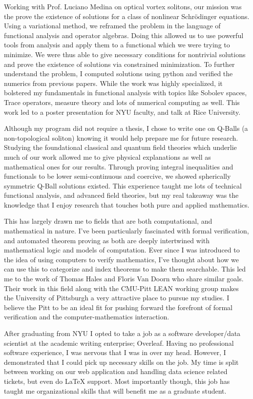 \documentclass[11pt]{article}
\begin{document}
Working with Prof. Luciano Medina on optical vortex solitons, our mission was the prove the existence of solutions for a class of nonlinear Schr\"{o}dinger equations. Using a variational method, we reframed the problem in the language of functional analysis and operator algebras. Doing this allowed us to use powerful tools from analysis and apply them to a functional which we were trying to minimize. We were thus able to give necessary conditions for nontrivial solutions and prove the existence of solutions via constrained minimization. To further understand the problem, I computed solutions using python and verified the numerics from previous papers. While the work was highly specialized, it bolstered my fundamentals in functional analysis with topics like Sobolev spaces, Trace operators, measure theory and lots of numerical computing as well. This work led to a poster presentation for NYU faculty, and talk at Rice University.

Although my program did not require a thesis, I chose to write one on Q-Balls (a non-topological soliton) knowing it would help prepare me for future research. Studying the foundational classical and quantum field theories which underlie much of our work allowed me to give physical explanations as well as mathematical ones for our results. Through proving integral inequalities and functionals to be lower semi-continuous and coercive, we showed spherically symmetric Q-Ball solutions existed. This experience taught me lots of technical functional analysis, and advanced field theories, but my real takeaway was the knowledge that I enjoy research that touches both pure and applied mathematics.

This has largely drawn me to fields that are both computational, and mathematical in nature. I've been particularly fascinated with formal verification, and automated theorem proving as both are deeply intertwined with mathematical logic and models of computation. Ever since I was introduced to the idea of using computers to verify mathematics, I've thought about how we can use this to categorize and index theorems to make them searchable. This led me to the work of Thomas Hales and Floris Van Doorn who share similar goals. Their work in this field along with the CMU-Pitt LEAN working group makes the University of Pittsburgh a very attractive place to pursue my studies. I believe the Pitt to be an ideal fit for pushing forward the forefront of formal verification and the computer-mathematics interaction.

After graduating from NYU I opted to take a job as a software developer/data scientist at the academic writing enterprise; Overleaf. Having no professional software experience, I was nervous that I was in over my head. However, I demonstrated that I could pick up necessary skills on the job. My time is split between working on our web application and handling data science related tickets, but even do \LaTeX{} support. Most importantly though, this job has taught me organizational skills that will benefit me as a graduate student. 
\end{document}
